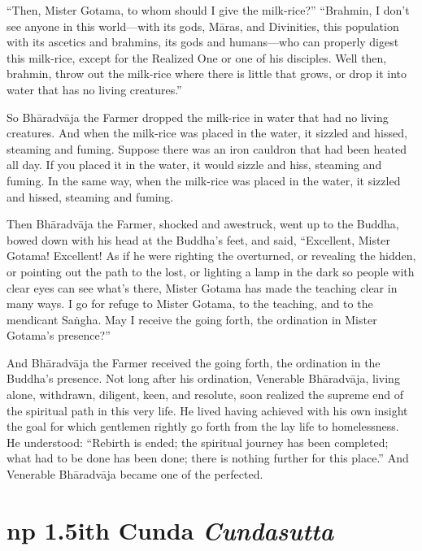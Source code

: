 \documentclass[12pt,openany]{book}%
\newcommand*{\suttatitleacronym}[1]{\smaller[2]{#1}\vspace*{.3em}}
\newcommand*{\suttatitletranslation}[1]{\linebreak{#1}}
\newcommand*{\suttatitleroot}[1]{\linebreak\smaller[2]\itshape{#1}}
\newcommand*{\tocacronym}[1]{\hspace*{-3.3em}{#1}\quad}
\newcommand*{\toctranslation}[1]{#1}
\newcommand*{\tocroot}[1]{(\textit{#1})}
\begin{document}
“Then, Mister Gotama, to whom should I give the milk-rice?” “Brahmin, I don’t see anyone in this world—with its gods, \textsanskrit{Māras}, and Divinities, this population with its ascetics and brahmins, its gods and humans—who can properly digest this milk-rice, except for the Realized One or one of his disciples. Well then, brahmin, throw out the milk-rice where there is little that grows, or drop it into water that has no living creatures.” 

So \textsanskrit{Bhāradvāja} the Farmer dropped the milk-rice in water that had no living creatures. And when the milk-rice was placed in the water, it sizzled and hissed, steaming and fuming. Suppose there was an iron cauldron that had been heated all day. If you placed it in the water, it would sizzle and hiss, steaming and fuming. In the same way, when the milk-rice was placed in the water, it sizzled and hissed, steaming and fuming. 

Then \textsanskrit{Bhāradvāja} the Farmer, shocked and awestruck,  went up to the Buddha, bowed down with his head at the Buddha’s feet, and said, “Excellent, Mister Gotama! Excellent! As if he were righting the overturned, or revealing the hidden, or pointing out the path to the lost, or lighting a lamp in the dark so people with clear eyes can see what’s there, Mister Gotama has made the teaching clear in many ways. I go for refuge to Mister Gotama, to the teaching, and to the mendicant \textsanskrit{Saṅgha}. May I receive the going forth, the ordination in Mister Gotama’s presence?” 

And \textsanskrit{Bhāradvāja} the Farmer received the going forth, the ordination in the Buddha’s presence. Not long after his ordination, Venerable \textsanskrit{Bhāradvāja}, living alone, withdrawn, diligent, keen, and resolute, soon realized the supreme end of the spiritual path in this very life. He lived having achieved with his own insight the goal for which gentlemen rightly go forth from the lay life to homelessness. He understood: “Rebirth is ended; the spiritual journey has been completed; what had to be done has been done; there is nothing further for this place.” And Venerable \textsanskrit{Bhāradvāja} became one of the perfected. 

%
\section*{{\suttatitleacronym Snp 1.5}{\suttatitletranslation With Cunda }{\suttatitleroot Cundasutta}}
\addcontentsline{toc}{section}{\tocacronym{Snp 1.5} \toctranslation{With Cunda } \tocroot{Cundasutta}}
\end{document}
